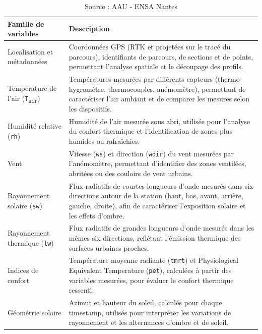 \documentclass{article}
\begin{document}
\begin{table}[H]
\centering
\renewcommand{\arraystretch}{1.25}
\begin{tabularx}{\textwidth}{l X}
\toprule
\textbf{Famille de variables} & \textbf{Description} \\
\midrule
Localisation et métadonnées &
Coordonnées GPS (RTK et projetées sur le tracé du parcours), identifiants de parcours, de sections et de points, permettant l’analyse spatiale et le découpage des profils. \\
\addlinespace
Température de l’air (\texttt{T\textsubscript{air}}) &
Températures mesurées par différents capteurs (thermo-hygromètre, thermocouples, anémomètre), permettant de caractériser l’air ambiant et de comparer les mesures selon les dispositifs. \\
\addlinespace
Humidité relative (\texttt{rh}) &
Humidité de l’air mesurée sous abri, utilisée pour l’analyse du confort thermique et l’identification de zones plus humides ou rafraîchies. \\
\addlinespace
Vent &
Vitesse (\texttt{ws}) et direction (\texttt{wdir}) du vent mesurées par l’anémomètre, permettant d’identifier des zones ventilées, abritées ou des couloirs de vent urbains. \\
\addlinespace
Rayonnement solaire (\texttt{sw}) &
Flux radiatifs de courtes longueurs d’onde mesurés dans six directions autour de la station (haut, bas, avant, arrière, gauche, droite), afin de caractériser l’exposition solaire et les effets d’ombre. \\
\addlinespace
Rayonnement thermique (\texttt{lw}) &
Flux radiatifs de grandes longueurs d’onde mesurés dans les mêmes six directions, reflétant l’émission thermique des surfaces urbaines proches. \\
\addlinespace
Indices de confort &
Température moyenne radiante (\texttt{tmrt}) et Physiological Equivalent Temperature (\texttt{pet}), calculées à partir des variables mesurées, pour évaluer le confort thermique ressenti. \\
\addlinespace
Géométrie solaire &
Azimut et hauteur du soleil, calculés pour chaque timestamp, utilisés pour interpréter les variations de rayonnement et les alternances d’ombre et de soleil. \\
\bottomrule
\end{tabularx}
\caption{Synthèse des principales variables mesurées lors des campagnes PICOPATT.}
\vspace{-0.45cm}
\caption*{\footnotesize Source : AAU - ENSA Nantes}
\label{tab:variables_picopatt}
\end{table}
\end{document}
